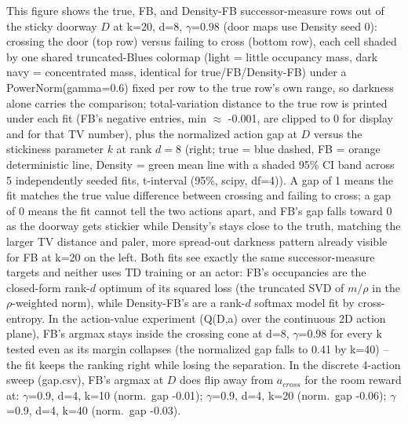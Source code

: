 This figure shows the true, FB, and Density-FB successor-measure rows out of the sticky doorway $D$ at k=20, d=8, $\gamma$=0.98 (door maps use Density seed 0): crossing the door (top row) versus failing to cross (bottom row), each cell shaded by one shared truncated-Blues colormap (light = little occupancy mass, dark navy = concentrated mass, identical for true/FB/Density-FB) under a PowerNorm(gamma=0.6) fixed per row to the true row's own range, so darkness alone carries the comparison; total-variation distance to the true row is printed under each fit (FB's negative entries, min $\approx$ -0.001, are clipped to 0 for display and for that TV number), plus the normalized action gap at $D$ versus the stickiness parameter $k$ at rank $d=8$ (right; true = blue dashed, FB = orange deterministic line, Density = green mean line with a shaded 95\% CI band across 5 independently seeded fits, t-interval (95\%, scipy, df=4)). A gap of 1 means the fit matches the true value difference between crossing and failing to cross; a gap of 0 means the fit cannot tell the two actions apart, and FB's gap falls toward 0 as the doorway gets stickier while Density's stays close to the truth, matching the larger TV distance and paler, more spread-out darkness pattern already visible for FB at k=20 on the left. Both fits see exactly the same successor-measure targets and neither uses TD training or an actor: FB's occupancies are the closed-form rank-$d$ optimum of its squared loss (the truncated SVD of $m/\rho$ in the $\rho$-weighted norm), while Density-FB's are a rank-$d$ softmax model fit by cross-entropy. In the action-value experiment (Q(D,a) over the continuous 2D action plane), FB's argmax stays inside the crossing cone at d=8, $\gamma$=0.98 for every k tested even as its margin collapses (the normalized gap falls to 0.41 by k=40) -- the fit keeps the ranking right while losing the separation. In the discrete 4-action sweep (gap.csv), FB's argmax at $D$ does flip away from $a_{cross}$ for the room reward at: $\gamma$=0.9, d=4, k=10 (norm.\ gap -0.01); $\gamma$=0.9, d=4, k=20 (norm.\ gap -0.06); $\gamma$=0.9, d=4, k=40 (norm.\ gap -0.03).
